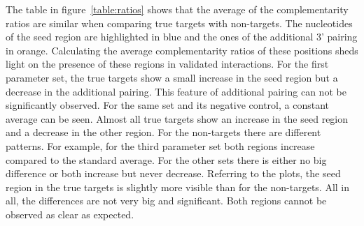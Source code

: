 \documentclass[11pt,  a4paper]{report}
\begin{document}
The table in figure~\ref{table:ratios} shows that the average of the complementarity ratios are similar when comparing true targets with non-targets. The nucleotides of the seed region are highlighted in blue and the ones of the additional 3' pairing in orange. Calculating the average complementarity ratios of these positions sheds light on the presence of these regions in validated interactions. For the first parameter set, the true targets show a small increase in the seed region but a decrease in the additional pairing. This feature of additional pairing can not be significantly observed. For the same set and its negative control, a constant average can be seen. Almost all true targets show an increase in the seed region and a decrease in the other region. For the non-targets there are different patterns. For example, for the third parameter set both regions increase compared to the standard average. For the other sets there is either no big difference or both increase but never decrease. Referring to the plots, the seed region in the true targets is slightly more visible than for the non-targets. All in all, the differences are not very big and significant. Both regions cannot be observed as clear as expected.  \\
\end{document}
